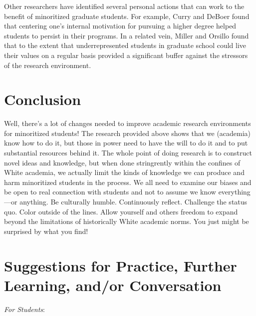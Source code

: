 \documentclass[
  11pt,
]{book}
\begin{document}
Other researchers have identified several personal actions that can work to the benefit of minoritized graduate students. For example, Curry and DeBoer \citeyearpar{curry_systematized_2020} found that centering one's internal motivation for pursuing a higher degree helped students to persist in their programs. In a related vein, Miller and Orsillo \citeyearpar{miller_values_2020} found that to the extent that underrepresented students in graduate school could live their values on a regular basis provided a significant buffer against the stressors of the research environment.

\section{Conclusion}\label{conclusion}

Well, there's a lot of changes needed to improve academic research environments for minoritized students! The research provided above shows that we (academia) know how to do it, but those in power need to have the will to do it and to put substantial resources behind it. The whole point of doing research is to construct novel ideas and knowledge, but when done stringrently within the confines of White academia, we actually limit the kinds of knowledge we can produce and harm minoritized students in the process. We all need to examine our biases and be open to real connection with students and not to assume we know everything---or anything. Be culturally humble. Continuously reflect. Challenge the status quo. Color outside of the lines. Allow yourself and others freedom to expand beyond the limitations of historically White academic norms. You just might be surprised by what you find!

\section{Suggestions for Practice, Further Learning, and/or Conversation}\label{suggestions-for-practice-further-learning-andor-conversation-3}

\emph{For Students}:
\end{document}
